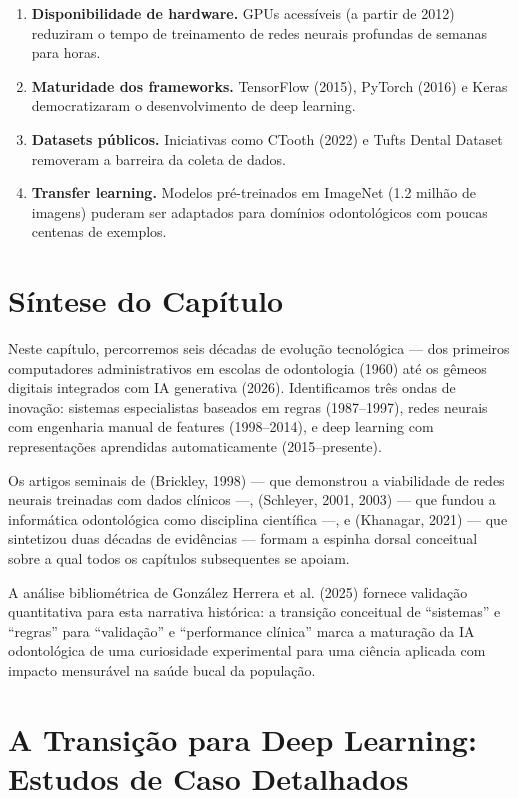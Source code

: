 \begin{enumerate}
    \item \textbf{Disponibilidade de hardware.} GPUs acessíveis (a partir de 2012) reduziram o tempo de treinamento de redes neurais profundas de semanas para horas.
    \item \textbf{Maturidade dos frameworks.} TensorFlow (2015), PyTorch (2016) e Keras democratizaram o desenvolvimento de deep learning.
    \item \textbf{Datasets públicos.} Iniciativas como CTooth (2022) e Tufts Dental Dataset removeram a barreira da coleta de dados.
    \item \textbf{Transfer learning.} Modelos pré-treinados em ImageNet (1.2 milhão de imagens) puderam ser adaptados para domínios odontológicos com poucas centenas de exemplos.
\end{enumerate}

\section{Síntese do Capítulo}

Neste capítulo, percorremos seis décadas de evolução tecnológica — dos primeiros computadores administrativos em escolas de odontologia (1960) até os gêmeos digitais integrados com IA generativa (2026). Identificamos três ondas de inovação: sistemas especialistas baseados em regras (1987--1997), redes neurais com engenharia manual de features (1998--2014), e deep learning com representações aprendidas automaticamente (2015--presente).

Os artigos seminais de  (Brickley, 1998) — que demonstrou a viabilidade de redes neurais treinadas com dados clínicos —,  (Schleyer, 2001, 2003) — que fundou a informática odontológica como disciplina científica —, e  (Khanagar, 2021) — que sintetizou duas décadas de evidências — formam a espinha dorsal conceitual sobre a qual todos os capítulos subsequentes se apoiam.

A análise bibliométrica de González Herrera et al. (2025) fornece validação quantitativa para esta narrativa histórica: a transição conceitual de ``sistemas'' e ``regras'' para ``validação'' e ``performance clínica'' marca a maturação da IA odontológica de uma curiosidade experimental para uma ciência aplicada com impacto mensurável na saúde bucal da população.

\section{A Transição para Deep Learning: Estudos de Caso Detalhados}


